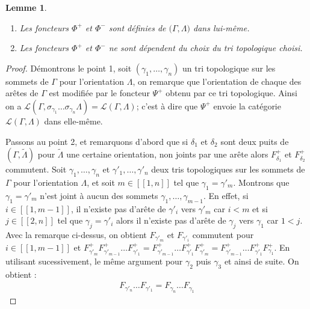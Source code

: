 \documentclass[a4paper,10pt]{article}
\newtheorem{lm}[]{Lemme}[section]
\begin{document}
\begin{lm}
  \begin{enumerate}
  \item Les foncteurs $\Phi^{+}$ et $\Phi^{-}$ sont définies de $\mathscr(\Gamma, \Lambda)$ dans lui-même.
  \item Les foncteurs $\Phi^{+}$ et $\Phi^{-}$ ne sont dépendent du choix du tri topologique choisi.
  \end{enumerate}
\end{lm}
\begin{proof}
  Démontrons le point 1, soit $(\gamma_{1}, \dots, \gamma_{n})$ un tri topologique sur les sommets de $\Gamma$ pour l'orientation $\Lambda$, on remarque que l'orientation de chaque des arêtes de $\Gamma$ est modifiée par le foncteur $\Psi^{+}$ obtenu par ce tri topologique. Ainsi on a $\mathscr L(\Gamma,\sigma_{\gamma_{1}} \dots \sigma_{\gamma_{n}}\Lambda) = \mathscr L(\Gamma,\Lambda)$; c'est à dire que $\Psi^{+}$ envoie la catégorie $\mathscr L(\Gamma,\Lambda)$ dans elle-même.

  Passons au point 2, et remarquons d'abord que si $\delta_{1}$ et $\delta_{2}$ sont deux puits de $(\Gamma,\widetilde \Lambda)$ pour $\widetilde \Lambda$ une certaine orientation, non joints par une arête alors $F^{+}_{\delta_{1}}$ et $F^{+}_{\delta_{2}}$ commutent. 
Soit $\gamma_{1}, \dots, \gamma_{n}$ et $\gamma'_{1}, \dots , \gamma'_{n}$ deux tris topologiques sur les sommets de $\Gamma$ pour l'orientation $\Lambda$, et soit $m \in [\![1,n]\!]$ tel que $\gamma_{1}= \gamma'_{m}$. Montrons que $\gamma_{1} = \gamma'_{m}$ n'est joint à aucun des sommets $\gamma_{1},\dots, \gamma_{m-1}$. En effet, si $i \in [\![1,m-1]\!]$, il n'existe pas d'arête de $\gamma'_{i}$ vers $\gamma'_{m}$ car $i<m$ et si $j \in [\![2,n]\!]$ tel que $\gamma_{j} = \gamma'_{i}$ alors il n'existe pas d'arête de $\gamma_{j}$ vers $\gamma_{1}$ car $1<j$. Avec la remarque ci-dessus, on obtient $F_{\gamma'_{m}}$ et $F_{\gamma'_{i}}$ commutent pour $i \in [\![1,m-1]\!]$ et $F^{+}_{\gamma'_{m}}F^{+}_{\gamma'_{m-1}}\dots F^{+}_{\gamma'_{1}} = F^{+}_{\gamma'_{m-1}}\dots F^{+}_{\gamma'_{1}} F^{+}_{\gamma'_{m}} = F^{+}_{\gamma'_{m-1}}\dots F^{+}_{\gamma'_{1}}F^{+}_{\gamma_{1}}$. En utilisant sucessivement, le même argument pour $\gamma_{2}$ puis $\gamma_{3}$ et ainsi de suite. On obtient : 
\begin{eqnarray}%
  F_{\gamma'_{n}}\dots F_{\gamma'_{1}} = F_{\gamma_{n}} \dots F_{\gamma_{1}}
\end{eqnarray}
\end{proof}
\end{document}
